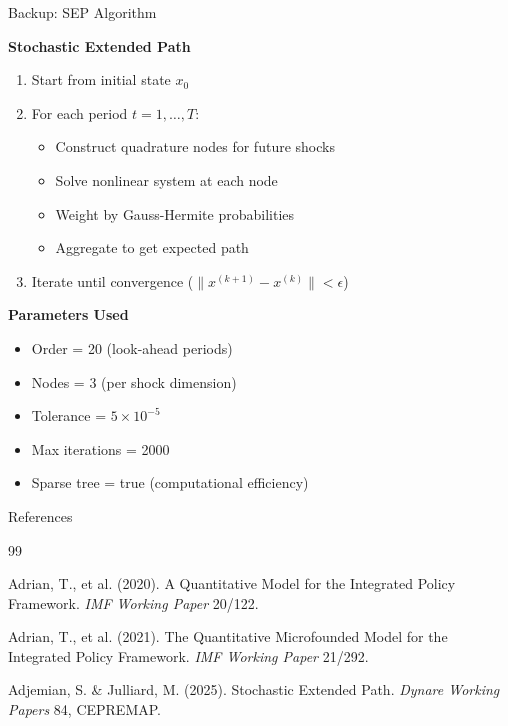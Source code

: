 \documentclass[aspectratio=169,12pt]{beamer}
\begin{document}
\begin{frame}{Backup: SEP Algorithm}

\textbf{Stochastic Extended Path} \citep{adjemian2025stochastic}

\begin{enumerate}
\item Start from initial state $x_0$
\item For each period $t = 1, \ldots, T$:
\begin{itemize}
\item Construct quadrature nodes for future shocks
\item Solve nonlinear system at each node
\item Weight by Gauss-Hermite probabilities
\item Aggregate to get expected path
\end{itemize}
\item Iterate until convergence ($\|x^{(k+1)} - x^{(k)}\| < \epsilon$)
\end{enumerate}

\vspace{0.3cm}
\textbf{Parameters Used}
\begin{itemize}
\item Order = 20 (look-ahead periods)
\item Nodes = 3 (per shock dimension)
\item Tolerance = $5 \times 10^{-5}$
\item Max iterations = 2000
\item Sparse tree = true (computational efficiency)
\end{itemize}

\end{frame}

\begin{frame}[allowframebreaks]{References}
\small
\begin{thebibliography}{99}

Adrian, T., et al. (2020).
\newblock A Quantitative Model for the Integrated Policy Framework.
\newblock \textit{IMF Working Paper} 20/122.

Adrian, T., et al. (2021).
\newblock The Quantitative Microfounded Model for the Integrated Policy Framework.
\newblock \textit{IMF Working Paper} 21/292.

Adjemian, S. \& Julliard, M. (2025).
\newblock Stochastic Extended Path.
\newblock \textit{Dynare Working Papers} 84, CEPREMAP.

\end{thebibliography}
\end{frame}
\end{document}
